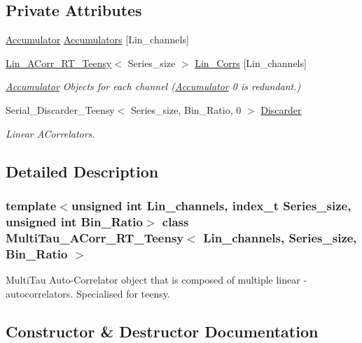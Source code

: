 \subsection*{Private Attributes}
\begin{DoxyCompactItemize}
\item 
\hyperlink{classAccumulator}{Accumulator} \hyperlink{classMultiTau__ACorr__RT__Teensy_a5b6f2659e905f143bc898a9b803eae24}{Accumulators} \mbox{[}Lin\+\_\+channels\mbox{]}
\item 
\hyperlink{classLin__ACorr__RT__Teensy}{Lin\+\_\+\+A\+Corr\+\_\+\+R\+T\+\_\+\+Teensy}$<$ Series\+\_\+size $>$ \hyperlink{classMultiTau__ACorr__RT__Teensy_a1dc1e665268e5774e2810b74e6dbebc4}{Lin\+\_\+\+Corrs} \mbox{[}Lin\+\_\+channels\mbox{]}
\begin{DoxyCompactList}\small\item\em \hyperlink{classAccumulator}{Accumulator} Objects for each channel (\hyperlink{classAccumulator}{Accumulator} \textquotesingle{}0\textquotesingle{} is redundant.) \end{DoxyCompactList}\item 
Serial\+\_\+\+Discarder\+\_\+\+Teensy$<$ Series\+\_\+size, Bin\+\_\+\+Ratio, 0 $>$ \hyperlink{classMultiTau__ACorr__RT__Teensy_ad216281408b0f32892d3c554ad16309e}{Discarder}
\begin{DoxyCompactList}\small\item\em Linear A\+Correlators. \end{DoxyCompactList}\end{DoxyCompactItemize}


\subsection{Detailed Description}
\subsubsection*{template$<$unsigned int Lin\+\_\+channels, index\+\_\+t Series\+\_\+size, unsigned int Bin\+\_\+\+Ratio$>$\newline
class Multi\+Tau\+\_\+\+A\+Corr\+\_\+\+R\+T\+\_\+\+Teensy$<$ Lin\+\_\+channels, Series\+\_\+size, Bin\+\_\+\+Ratio $>$}

Multi\+Tau Auto-\/\+Correlator object that is composed of multiple linear -\/ autocorrelators. Specialised for teensy. 

\subsection{Constructor \& Destructor Documentation}
\mbox{\label{classMultiTau__ACorr__RT__Teensy_a28cfdcd7468aac93693a4d4803fc95f9}} 
